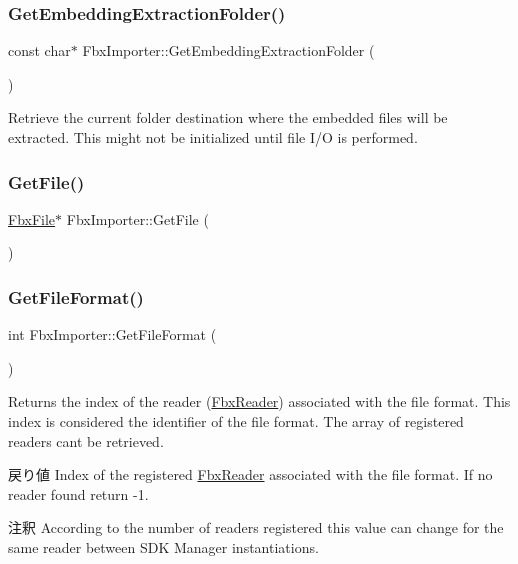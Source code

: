 \subsubsection{\texorpdfstring{Get\+Embedding\+Extraction\+Folder()}{GetEmbeddingExtractionFolder()}}
{\footnotesize\ttfamily const char$\ast$ Fbx\+Importer\+::\+Get\+Embedding\+Extraction\+Folder (\begin{DoxyParamCaption}{ }\end{DoxyParamCaption})}

Retrieve the current folder destination where the embedded files will be extracted. This might not be initialized until file I/O is performed. \mbox{\label{class_fbx_importer_aae49abec02c1df7de8a7e12480607c08}} 
\subsubsection{\texorpdfstring{Get\+File()}{GetFile()}}
{\footnotesize\ttfamily \hyperlink{class_fbx_file}{Fbx\+File}$\ast$ Fbx\+Importer\+::\+Get\+File (\begin{DoxyParamCaption}{ }\end{DoxyParamCaption})}

\mbox{\label{class_fbx_importer_aeb6c0b442442cf1bf55f3de19983df99}} 
\subsubsection{\texorpdfstring{Get\+File\+Format()}{GetFileFormat()}}
{\footnotesize\ttfamily int Fbx\+Importer\+::\+Get\+File\+Format (\begin{DoxyParamCaption}{ }\end{DoxyParamCaption})}

Returns the index of the reader (\hyperlink{class_fbx_reader}{Fbx\+Reader}) associated with the file format. This index is considered the identifier of the file format. The array of registered readers can\textquotesingle{}t be retrieved. \begin{DoxyReturn}{戻り値}
Index of the registered \hyperlink{class_fbx_reader}{Fbx\+Reader} associated with the file format. If no reader found return -\/1. 
\end{DoxyReturn}
\begin{DoxyRemark}{注釈}
According to the number of readers registered this value can change for the same reader between S\+DK Manager instantiations. 
\end{DoxyRemark}
\mbox{\label{class_fbx_importer_aceaf0258f8ad1275cbe6bf245133e058}} 

